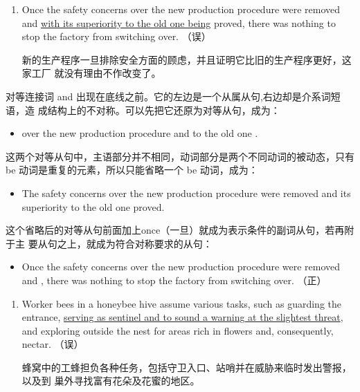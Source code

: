 \begin{enumerate}[resume]
\item Once the safety concerns over the new production procedure were removed
  and \ul{with its superiority to the old one being} proved, there was nothing to
  stop the factory from switching over. （误）

  新的生产程序一旦排除安全方面的顾虑，并且证明它比旧的生产程序更好，这家工厂
  就没有理由不作改变了。
\end{enumerate}

对等连接词 and 出现在底线之前。它的左边是一个从属从句,右边却是介系词短语，造
成结构上的不对称。可以先把它还原为对等从句，成为：
\begin{itemize}
\item {} over the new production procedure
   and  to the old one
  .
\end{itemize}

这两个对等从句中，主语部分并不相同，动词部分是两个不同动词的被动态，只有
be 动词是重复的元素，所以只能省略一个 be 动词，成为：
\begin{itemize}
\item The safety concerns over the new production procedure were removed and
  its superiority to the old one proved.
\end{itemize}

这个省略后的对等从句前面加上once（一旦）就成为表示条件的副词从句，若再附于主
要从句之上，就成为符合对称要求的从句：
\begin{mybox}
\begin{itemize}
\item Once the safety concerns over the new production procedure were removed
  and , there was nothing to stop the
  factory from switching over. （正）
\end{itemize}
\end{mybox}

\begin{enumerate}[resume]
\item Worker bees in a honeybee hive assume various tasks, such as guarding the
  entrance, \ul{serving as sentinel and to sound a warning at the slightest
  threat}, and exploring outside the nest for areas rich in flowers and,
  consequently, nectar. （误）

  蜂窝中的工蜂担负各种任务，包括守卫入口、站哨并在威胁来临时发出警报，以及到
  巢外寻找富有花朵及花蜜的地区。
\end{enumerate}

